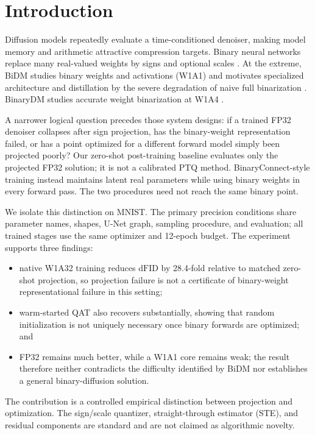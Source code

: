 \documentclass[conference]{IEEEtran}
\newcommand{\dfid}{\ensuremath{\mathrm{dFID}}}
\begin{document}
\section{Introduction}

Diffusion models repeatedly evaluate a time-conditioned denoiser, making model
memory and arithmetic attractive compression targets. Binary neural networks
replace many real-valued weights by signs and optional scales
\cite{hubara2016bnn,rastegari2016xnornet}. At the extreme, BiDM studies binary
weights and activations (W1A1) and motivates specialized architecture and
distillation by the severe degradation of naive full binarization
\cite{bidm2024}. BinaryDM studies accurate weight binarization at W1A4
\cite{binarydm2025}.

A narrower logical question precedes those system designs: if a trained FP32
denoiser collapses after sign projection, has the binary-weight representation
failed, or has a point optimized for a different forward model simply been
projected poorly? Our zero-shot post-training baseline evaluates only the
projected FP32 solution; it is not a calibrated PTQ method.
BinaryConnect-style training instead maintains latent real parameters while
using binary weights in every forward pass\cite{courbariaux2015binaryconnect}.
The two procedures need not reach the same binary point.

We isolate this distinction on MNIST. The primary precision conditions share
parameter names, shapes, U-Net graph, sampling procedure, and evaluation; all
trained stages use the same optimizer and 12-epoch budget. The experiment
supports three findings:
\begin{itemize}
  \item native W1A32 training reduces \dfid{} by 28.4-fold relative to matched
  zero-shot projection, so projection failure is not a certificate of binary-weight
  representational failure in this setting;
  \item warm-started QAT also recovers substantially, showing that random
  initialization is not uniquely necessary once binary forwards are optimized;
  and
  \item FP32 remains much better, while a W1A1 core remains weak; the result
  therefore neither contradicts the difficulty identified by BiDM nor
  establishes a general binary-diffusion solution.
\end{itemize}

The contribution is a controlled empirical distinction between projection and
optimization. The sign/scale quantizer, straight-through estimator (STE), and
residual components are standard and are not claimed as algorithmic novelty.
\end{document}
